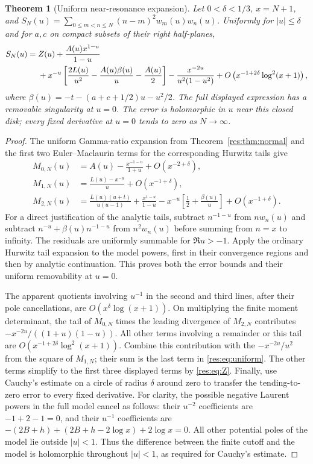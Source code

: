 \documentclass[11pt,letterpaper]{article}
\numberwithin{equation}{section}
\theoremstyle{plain}
\newtheorem{theorem}{Theorem}[section]
\theoremstyle{definition}
\theoremstyle{remark}
\begin{document}
\begin{theorem}[Uniform near-resonance expansion]
\label{res:thm:uniform}
Let $0<\delta<1/3$, $x=N+1$, and
$S_N(u)=\sum_{0\leq m<n\leq N}(n-m)^2w_m(u)w_n(u)$.
Uniformly for $|u|\leq\delta$ and for $a,c$ on compact subsets of
their right half-planes,
\begin{align}
 S_N(u)={}&Z(u)+\frac{A(u)x^{1-u}}{1-u}\notag\\
 &+x^{-u}\left[\frac{2L(u)}{u^2}
              -\frac{A(u)\beta(u)}u-\frac{A(u)}2\right]
       -\frac{x^{-2u}}{u^2(1-u^2)}
       +O\left(x^{-1+2\delta}\log^2(x+1)\right),
 \label{res:eq:uniform}
\end{align}
where $\beta(u)=-t-(a+c+1/2)u-u^2/2$.
The full displayed expression has a removable singularity at $u=0$.
The error is holomorphic in $u$ near this closed disk; every fixed
derivative at $u=0$ tends to zero as $N\to\infty$.
\end{theorem}
\begin{proof}
The uniform Gamma-ratio expansion from
Theorem~\ref{res:thm:normal} and the first two Euler--Maclaurin
terms for the corresponding Hurwitz tails
\cite[Equation 25.11.43]{DLMF} give
\begin{align*}
 M_{0,N}(u)&=A(u)-\frac{x^{-1-u}}{1+u}
                   +O(x^{-2+\delta}),\\
 M_{1,N}(u)&=\frac{L(u)-x^{-u}}u+O(x^{-1+\delta}),\\
 M_{2,N}(u)&=\frac{L(u)(u+t)}{u(u-1)}
       +\frac{x^{1-u}}{1-u}
       -x^{-u}\left[\frac12+\frac{\beta(u)}u\right]
       +O(x^{-1+\delta}).
\end{align*}
For a direct justification of the analytic tails, subtract
$n^{-1-u}$ from $nw_n(u)$ and subtract
$n^{-u}+\beta(u)n^{-1-u}$ from $n^2w_n(u)$ before summing from
$n=x$ to infinity.  The residuals are uniformly summable for
$\Re u>-1$.  Apply the ordinary Hurwitz tail expansion to the
model powers, first in their convergence regions and then by
analytic continuation.  This proves both the error bounds and
their uniform removability at $u=0$.

The apparent quotients involving $u^{-1}$ in the second and third
lines, after their pole cancellations, are
$O(x^\delta\log(x+1))$.  On multiplying the finite moment
determinant, the tail of $M_{0,N}$ times the leading divergence of
$M_{2,N}$ contributes
$-x^{-2u}/((1+u)(1-u))$.  All other terms involving a remainder
or this tail are $O(x^{-1+2\delta}\log^2(x+1))$.
Combine this contribution with the $-x^{-2u}/u^2$ from the square
of $M_{1,N}$; their sum is the last term in
\eqref{res:eq:uniform}.  The other terms simplify to the first
three displayed terms by \eqref{res:eq:Z}.
Finally, use Cauchy's estimate on a circle of radius $\delta$
around zero to transfer the tending-to-zero error to every fixed
derivative.  For clarity, the possible negative Laurent powers in
the full model cancel as follows: their $u^{-2}$ coefficients are
$-1+2-1=0$, and their $u^{-1}$ coefficients are
$-(2B+h)+(2B+h-2\log x)+2\log x=0$.
All other potential poles of the model lie outside $|u|<1$.
Thus the difference between the finite cutoff and the model is
holomorphic throughout $|u|<1$, as required for Cauchy's estimate.
\end{proof}
\end{document}

